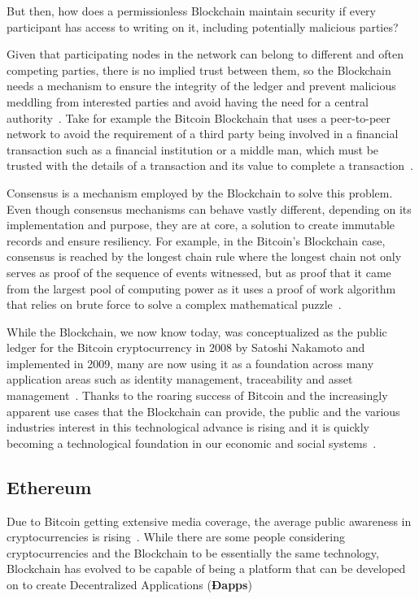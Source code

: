   But then, how does a permissionless Blockchain maintain security if every
  participant has access to writing on it, including potentially malicious
  parties?

  Given that participating nodes in the network can belong to different and
  often competing parties, there is no implied trust between them, so the
  Blockchain needs a mechanism to ensure the integrity of the ledger and
  prevent malicious meddling from interested parties and avoid having the need
  for a central authority~\cite{Barclay2017}.  Take for example the Bitcoin
  Blockchain that uses a peer-to-peer network to avoid the requirement of a
  third party being involved in a financial transaction such as a financial
  institution or a middle man, which must be trusted with the details of a
  transaction and its value to complete a transaction~\cite{Nakamoto2008}.

  Consensus is a mechanism employed by the Blockchain to solve this problem.
  Even though consensus mechanisms can behave vastly different, depending on
  its implementation and purpose, they are at core, a solution to create
  immutable records and ensure resiliency.  For example, in the Bitcoin's
  Blockchain case, consensus is reached by the longest chain rule where the
  longest chain not only serves as proof of the sequence of events witnessed,
  but as proof that it came from the largest pool of computing power as it uses
  a proof of work algorithm that relies on brute force to solve a complex
  mathematical puzzle~\cite{Baars2016,Wood2017}.

  While the Blockchain, we now know today, was conceptualized as the public
  ledger for the Bitcoin cryptocurrency in 2008 by Satoshi Nakamoto and
  implemented in 2009, many are now using it as a foundation across many
  application areas such as identity management, traceability and asset
  management~\cite{MIT2016}. Thanks to the roaring success of Bitcoin and the
  increasingly apparent use cases that the Blockchain can provide, the public
  and the various industries interest in this technological advance is rising
  and it is quickly becoming a technological foundation in our economic and
  social systems~\cite{Zago2018, Marr2018,Long2018}.

  \subsection{Ethereum}

  Due to Bitcoin getting extensive media coverage, the average public awareness
  in cryptocurrencies is rising~\cite{BitAwareness2017}. While there are some
  people considering cryptocurrencies and the Blockchain to be essentially the
  same technology, Blockchain has evolved to be capable of being a platform
  that can be developed on to create Decentralized Applications
  (\textbf{Ðapps})


